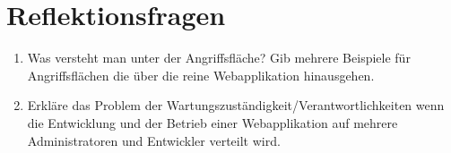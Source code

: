 \section{Reflektionsfragen}

\begin{enumerate}
	\item Was versteht man unter der Angriffsfläche? Gib mehrere Beispiele für Angriffsflächen die über die reine Webapplikation hinausgehen.
	\item Erkläre das Problem der Wartungszuständigkeit/Verantwortlichkeiten wenn die Entwicklung und der Betrieb einer Webapplikation auf mehrere Administratoren und Entwickler verteilt wird.
\end{enumerate}

